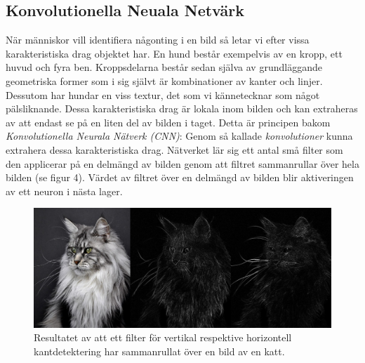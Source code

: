 \documentclass[a4paper,11pt,twoside]{article}
\begin{document}
\subsection{Konvolutionella Neuala Netvärk}
När människor vill identifiera någonting i en bild så letar vi efter vissa karakteristiska drag objektet har. En hund består exempelvis av en kropp, ett huvud och fyra ben. Kroppsdelarna består sedan själva av grundläggande geometriska former som i sig självt är kombinationer av kanter och linjer. Dessutom har hundar en viss textur, det som vi kännetecknar som något pälsliknande. Dessa karakteristiska drag är lokala inom bilden och kan extraheras av att endast se på en liten del av bilden i taget. Detta är principen bakom \textit{Konvolutionella Neurala Nätverk (CNN)}: Genom så kallade \textit{konvolutioner} kunna extrahera dessa karakteristiska drag. Nätverket lär sig ett antal små filter som den applicerar på en delmängd av bilden genom att filtret sammanrullar över hela bilden (se figur 4). Värdet av filtret över en delmängd av bilden blir aktiveringen av ett neuron i nästa lager. \cite{cs231n}

\begin{figure}[h]\label{figkatter}
	\centering
  		\includegraphics[scale=0.33]{katter.png}
  	\caption{Resultatet av att ett filter för vertikal respektive horizontell kantdetektering har sammanrullat över en bild av en katt.}
\end{figure}
\end{document}
